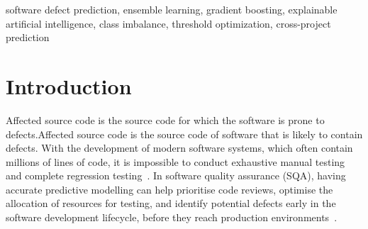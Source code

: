 \documentclass[conference]{IEEEtran}
\begin{document}
\begin{IEEEkeywords}
software defect prediction, ensemble learning, gradient boosting,
explainable artificial intelligence, class imbalance, threshold optimization,
cross-project prediction
\end{IEEEkeywords}

\section{Introduction}
\label{sec:introduction}

Affected source code is the source code for which the software is prone to defects.Affected source code is the source code of software that is likely to contain defects.
With the development of modern software systems, which often contain millions of lines of code, it is impossible to conduct exhaustive manual testing and complete regression testing~\cite{haldar2024interpretable}.
In software quality assurance (SQA), having accurate predictive modelling can help prioritise code reviews, optimise the allocation of resources for testing, and identify potential defects early in the software development lifecycle, before they reach production environments~\cite{li2025modelaveraging}.
\end{document}
